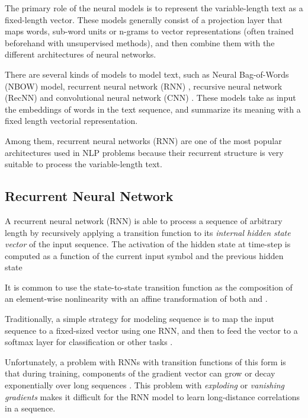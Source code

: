 \documentclass{article}
\begin{document}
The primary role of the neural models is to represent the variable-length text as a fixed-length vector. These models generally consist of a projection layer that maps words, sub-word units or n-grams to vector representations (often trained beforehand with unsupervised methods), and then combine them with the different architectures of neural networks.

There are several kinds of models to model text, such as Neural Bag-of-Words (NBOW) model, recurrent neural network (RNN) \cite{chung2014empirical}, recursive neural network (RecNN) \cite{socher2012semantic,socher2013recursive} and convolutional neural network (CNN) \cite{collobert2011natural,kalchbrenner2014convolutional}. These models take as input the embeddings of words in the text sequence, and summarize its meaning with a fixed length vectorial representation.



Among them, recurrent neural networks (RNN) are one of the most popular architectures used in NLP problems because their recurrent structure is very suitable to process the variable-length text.

\subsection{Recurrent Neural Network}

A recurrent neural network (RNN) \cite{Elman:1990} is able to process a sequence of arbitrary length by recursively applying a
transition function to its \emph{internal hidden state vector}  of the input sequence. The activation
 of the hidden state  at time-step  is computed as a function  of the current input symbol
   and the previous hidden state 

It is common to use the state-to-state transition function  as the composition of an element-wise nonlinearity with an affine transformation of both  and .


Traditionally, a simple strategy for modeling sequence is to map the input sequence to a fixed-sized vector using one RNN, and then to feed the vector to a softmax layer for classification or other tasks \cite{cho2014learning}.

Unfortunately, a problem with RNNs with transition functions of this form is that during training, components of the gradient vector can grow or decay exponentially over long sequences \cite{hochreiter2001gradient,hochreiter1997long}.
This problem with \emph{exploding} or \emph{vanishing gradients} makes it difficult for the RNN model to learn long-distance correlations in a sequence.
\end{document}
